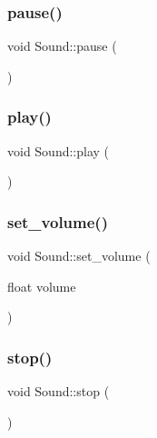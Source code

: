 \subsubsection{\texorpdfstring{pause()}{pause()}}
{\footnotesize\ttfamily void Sound\+::pause (\begin{DoxyParamCaption}{ }\end{DoxyParamCaption})\hspace{0.3cm}{\ttfamily [inline]}}

\mbox{\label{class_sound_aad595b0dc5459e110b53a4e6b2adb0e4}} 
\subsubsection{\texorpdfstring{play()}{play()}}
{\footnotesize\ttfamily void Sound\+::play (\begin{DoxyParamCaption}{ }\end{DoxyParamCaption})\hspace{0.3cm}{\ttfamily [inline]}}

\mbox{\label{class_sound_a42d01b791f788544ecc5d59fc25a1c28}} 
\subsubsection{\texorpdfstring{set\+\_\+volume()}{set\_volume()}}
{\footnotesize\ttfamily void Sound\+::set\+\_\+volume (\begin{DoxyParamCaption}\item[{float}]{volume }\end{DoxyParamCaption})\hspace{0.3cm}{\ttfamily [inline]}}

\mbox{\label{class_sound_a07c551ab56d2f83a861a2f7fd81b480a}} 
\subsubsection{\texorpdfstring{stop()}{stop()}}
{\footnotesize\ttfamily void Sound\+::stop (\begin{DoxyParamCaption}{ }\end{DoxyParamCaption})\hspace{0.3cm}{\ttfamily [inline]}}


